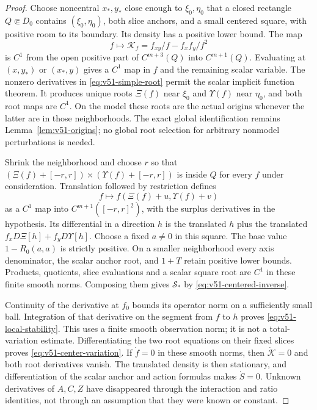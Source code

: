 \begin{proof}
Choose noncentral $x_*,y_*$ close enough to $\xi_0,\eta_0$ that a
closed rectangle $Q\Subset D_0$ contains $(\xi_0,\eta_0)$, both slice
anchors, and a small centered square, with positive room to its boundary.
Its density has a positive lower bound.  The map
\[
 f\longmapsto\mathcal K_f=f_{xy}/f-f_xf_y/f^2
\]
is $C^1$ from the open positive part of $C^{m+3}(Q)$ into
$C^{m+1}(Q)$.  Evaluating at $(x,y_*)$ or $(x_*,y)$ gives a $C^1$
map in $f$ and the remaining scalar variable.  The nonzero derivatives
in \eqref{eq:v51-simple-root} permit the scalar implicit function theorem.
It produces unique roots $\Xi(f)$ near $\xi_0$ and $\Upsilon(f)$
near $\eta_0$, and both root maps are $C^1$.  On the model these roots
are the actual origins whenever the latter are in those neighborhoods.
The exact global identification remains Lemma~\ref{lem:v51-origins};
no global root selection for arbitrary nonmodel perturbations is needed.

Shrink the neighborhood and choose $r$ so that
$(\Xi(f)+[-r,r])\times(\Upsilon(f)+[-r,r])$ is inside $Q$ for every
$f$ under consideration.  Translation followed by restriction defines
\[
 f\longmapsto f(\Xi(f)+u,\Upsilon(f)+v)
\]
as a $C^1$ map into $C^{m+1}([-r,r]^2)$, with the surplus derivatives
in the hypothesis.  Its differential in a direction $h$ is the translated
$h$ plus the translated $f_x D\Xi[h]+f_y D\Upsilon[h]$.
Choose a fixed $a\ne0$ in this square.  The base value
$1-R_0(a,a)$ is strictly positive.  On a smaller neighborhood every
axis denominator, the scalar anchor root, and $1+T$ retain positive
lower bounds.  Products, quotients, slice evaluations and a scalar square
root are $C^1$ in these finite smooth norms.  Composing them gives
$\mathcal S_*$ by \eqref{eq:v51-centered-inverse}.

Continuity of the derivative at $f_0$ bounds its operator norm on a
sufficiently small ball.  Integration of that derivative on the segment
from $f$ to $h$ proves \eqref{eq:v51-local-stability}.  This uses a
finite smooth observation norm; it is not a total-variation estimate.
Differentiating the two root equations on their fixed slices proves
\eqref{eq:v51-center-variation}.  If $\dot f=0$ in these smooth norms,
then $\dot{\mathcal K}=0$ and both root derivatives vanish.  The
translated density is then stationary, and differentiation of the scalar
anchor and action formulas makes $\dot S=0$.  Unknown derivatives of
$A,C,Z$ have disappeared through the interaction and ratio identities,
not through an assumption that they were known or constant.
\end{proof}

